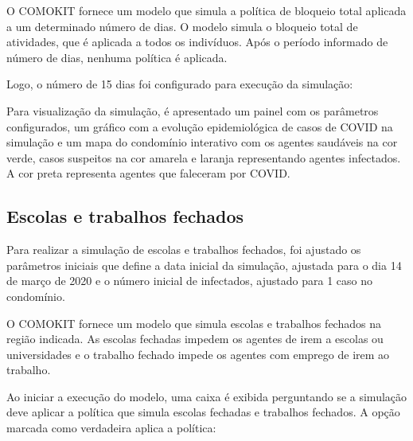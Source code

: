 
O COMOKIT fornece um modelo que simula a política de bloqueio total aplicada a um determinado número de dias. O modelo simula o bloqueio total de atividades, que é aplicada a todos os indivíduos. Após o período informado de número de dias, nenhuma política é aplicada. 

Logo, o número de 15 dias foi configurado para execução da simulação:


Para visualização da simulação, é apresentado um painel com os parâmetros configurados, um gráfico com a evolução epidemiológica de casos de COVID na simulação e um mapa do condomínio interativo com os agentes saudáveis na cor verde, casos suspeitos na cor amarela e laranja representando agentes infectados. A cor preta representa agentes que faleceram por COVID.





\subsection{Escolas e trabalhos fechados}

Para realizar a simulação de escolas e trabalhos fechados, foi ajustado os parâmetros iniciais que define a data inicial da simulação, ajustada para o dia 14 de março de 2020 e o número inicial de infectados, ajustado para 1 caso no condomínio.


O COMOKIT fornece um modelo que simula escolas e trabalhos fechados na região indicada. As escolas fechadas impedem os agentes de irem a escolas ou universidades e o trabalho fechado impede os agentes com emprego de irem ao trabalho.

Ao iniciar a execução do modelo, uma caixa é exibida perguntando se a simulação deve aplicar a política que simula escolas fechadas e trabalhos fechados. A opção marcada como verdadeira aplica a política:

